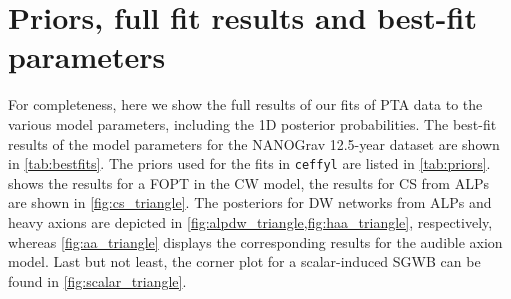 \documentclass{article}
\begin{document}
\appendix

\section{Priors, full fit results and best-fit parameters}
\label{app:triangle_plots}
For completeness, here we show the full results of our fits of PTA data to the various model parameters, including the 1D posterior probabilities.
The best-fit results of the model parameters for the NANOGrav 12.5-year dataset are shown in \cref{tab:bestfits}.
The priors used for the fits in \texttt{ceffyl} are listed in \cref{tab:priors}.
 shows the results for a FOPT in the CW model, the results for CS from ALPs are shown in \cref{fig:cs_triangle}. The posteriors for DW networks from ALPs and heavy axions are depicted in \cref{fig:alpdw_triangle,fig:haa_triangle}, respectively, whereas \cref{fig:aa_triangle} displays the corresponding results for the audible axion model.
Last but not least, the corner plot for a scalar-induced SGWB can be found in \cref{fig:scalar_triangle}.
\end{document}
